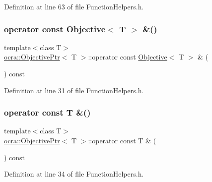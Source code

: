 Definition at line 63 of file Function\+Helpers.\+h.

\hypertarget{classocra_1_1ObjectivePtr_adfab05ef2537b16ed6f98dc9ba56d644}{}\label{classocra_1_1ObjectivePtr_adfab05ef2537b16ed6f98dc9ba56d644} 
\subsubsection{\texorpdfstring{operator const Objective$<$ T $>$ \&()}{operator const Objective< T > \&()}}
{\footnotesize\ttfamily template$<$class T$>$ \\
\hyperlink{classocra_1_1ObjectivePtr}{ocra\+::\+Objective\+Ptr}$<$ T $>$\+::operator const \hyperlink{classocra_1_1Objective}{Objective}$<$ T $>$ \& (\begin{DoxyParamCaption}{ }\end{DoxyParamCaption}) const\hspace{0.3cm}{\ttfamily [inline]}}



Definition at line 31 of file Function\+Helpers.\+h.

\hypertarget{classocra_1_1ObjectivePtr_a92dbd59e4c4383643df81e74fe267079}{}\label{classocra_1_1ObjectivePtr_a92dbd59e4c4383643df81e74fe267079} 
\subsubsection{\texorpdfstring{operator const T \&()}{operator const T \&()}}
{\footnotesize\ttfamily template$<$class T$>$ \\
\hyperlink{classocra_1_1ObjectivePtr}{ocra\+::\+Objective\+Ptr}$<$ T $>$\+::operator const T \& (\begin{DoxyParamCaption}{ }\end{DoxyParamCaption}) const\hspace{0.3cm}{\ttfamily [inline]}}



Definition at line 34 of file Function\+Helpers.\+h.

\hypertarget{classocra_1_1ObjectivePtr_a9a4d3901e8ffabcce57254502858181c}{}\label{classocra_1_1ObjectivePtr_a9a4d3901e8ffabcce57254502858181c} 
